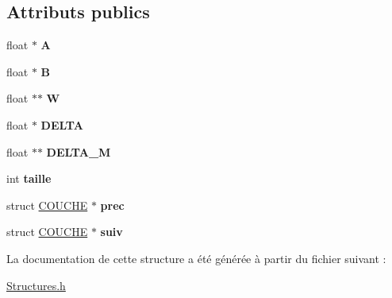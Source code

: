 \subsection*{Attributs publics}
\begin{DoxyCompactItemize}
\item 
float $\ast$ {\bfseries A}\hypertarget{structCOUCHE_a2218fee1751e9b8b7355ebe577938f8a}{}\label{structCOUCHE_a2218fee1751e9b8b7355ebe577938f8a}

\item 
float $\ast$ {\bfseries B}\hypertarget{structCOUCHE_ae39541beb5026e0dc23b79066d841d8a}{}\label{structCOUCHE_ae39541beb5026e0dc23b79066d841d8a}

\item 
float $\ast$$\ast$ {\bfseries W}\hypertarget{structCOUCHE_a73df475e85bcea1ab23f681777d2ca2b}{}\label{structCOUCHE_a73df475e85bcea1ab23f681777d2ca2b}

\item 
float $\ast$ {\bfseries D\+E\+L\+TA}\hypertarget{structCOUCHE_a091237265ad9fafe21bad7b8a9cb41e1}{}\label{structCOUCHE_a091237265ad9fafe21bad7b8a9cb41e1}

\item 
float $\ast$$\ast$ {\bfseries D\+E\+L\+T\+A\+\_\+M}\hypertarget{structCOUCHE_ac28815a9c587cba7def4901a7bcfd244}{}\label{structCOUCHE_ac28815a9c587cba7def4901a7bcfd244}

\item 
int {\bfseries taille}\hypertarget{structCOUCHE_af841b5acbf63ea3b57522ce796497719}{}\label{structCOUCHE_af841b5acbf63ea3b57522ce796497719}

\item 
struct \hyperlink{structCOUCHE}{C\+O\+U\+C\+HE} $\ast$ {\bfseries prec}\hypertarget{structCOUCHE_ada93a5c424f0cc1b52d549866ffcd6f9}{}\label{structCOUCHE_ada93a5c424f0cc1b52d549866ffcd6f9}

\item 
struct \hyperlink{structCOUCHE}{C\+O\+U\+C\+HE} $\ast$ {\bfseries suiv}\hypertarget{structCOUCHE_a17139b5e6dd8e69f1704d902742085cc}{}\label{structCOUCHE_a17139b5e6dd8e69f1704d902742085cc}

\end{DoxyCompactItemize}


La documentation de cette structure a été générée à partir du fichier suivant \+:\begin{DoxyCompactItemize}
\item 
\hyperlink{Structures_8h}{Structures.\+h}\end{DoxyCompactItemize}

